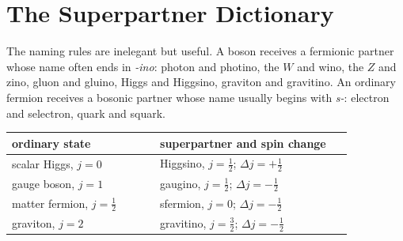 \begin{classroomqa}
\end{classroomqa}

\begin{classroomqa}
\end{classroomqa}

\section{The Superpartner Dictionary}

The naming rules are inelegant but useful. A boson receives a fermionic partner whose name often ends in \emph{-ino}: photon and photino, the \(W\) and wino, the \(Z\) and zino, gluon and gluino, Higgs and Higgsino, graviton and gravitino. An ordinary fermion receives a bosonic partner whose name usually begins with \emph{s-}: electron and selectron, quark and squark.

\begin{center}
\begin{tabular}{@{}>{\raggedright\arraybackslash}p{0.40\linewidth}>{\raggedright\arraybackslash}p{0.52\linewidth}@{}}
\toprule
ordinary state & superpartner and spin change\\
\midrule
scalar Higgs, \(j=0\) & Higgsino, \(j=\tfrac12\); \(\Delta j=+\tfrac12\)\\
gauge boson, \(j=1\) & gaugino, \(j=\tfrac12\); \(\Delta j=-\tfrac12\)\\
matter fermion, \(j=\tfrac12\) & sfermion, \(j=0\); \(\Delta j=-\tfrac12\)\\
graviton, \(j=2\) & gravitino, \(j=\tfrac32\); \(\Delta j=-\tfrac12\)\\
\bottomrule
\end{tabular}
\end{center}

